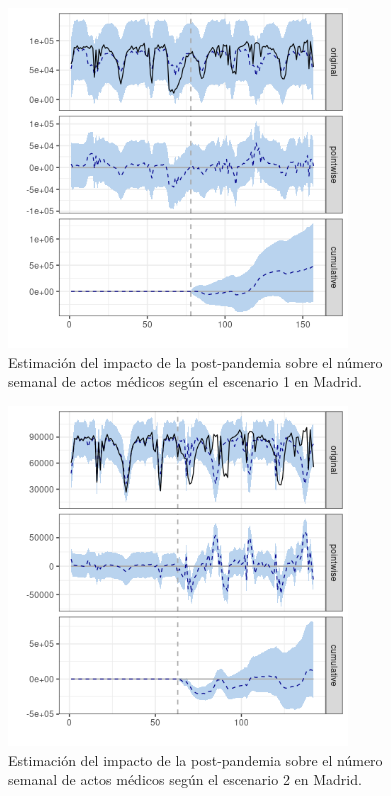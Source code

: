 \documentclass[12pt,twoside]{article} %
\begin{document}
  \begin{center}
  \begin{figure}[H]
    \includegraphics[width=9cm]{global_post_scen1_Madrid.png}\caption{Estimación del impacto de la post-pandemia sobre el número semanal de actos médicos según el escenario 1 en Madrid.}
  \end{figure}
  \end{center}
  
  \begin{center}
      \begin{figure}[H]
        \includegraphics[width=9cm]{global_post_scen2_Madrid.png}\caption{Estimación del impacto de la post-pandemia sobre el número semanal de actos médicos según el escenario 2 en Madrid.}
      \end{figure}
      \end{center}
\end{document}
